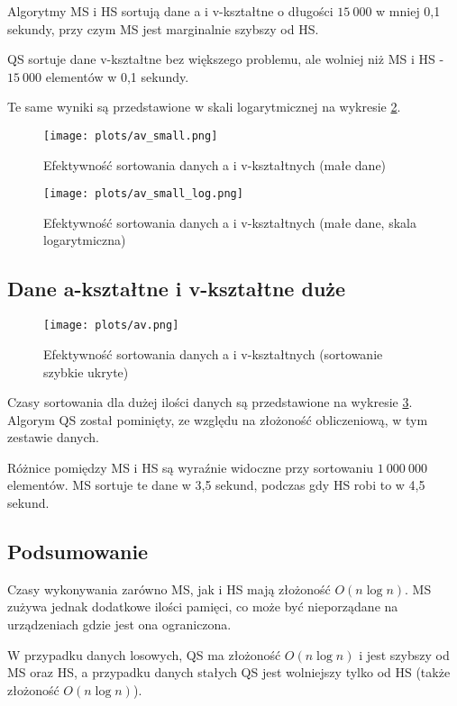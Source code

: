 \documentclass[11pt,twocolumn]{article}
\begin{document}
Algorytmy MS i HS sortują dane a i v-kształtne o długości $15\ 000$ w mniej 0,1 sekundy, przy czym MS jest marginalnie szybszy od HS.

QS sortuje dane v-kształtne bez większego problemu, ale wolniej niż MS i HS - $15\ 000$ elementów w 0,1 sekundy.

Te same wyniki są przedstawione w skali logarytmicznej na wykresie \ref{av_ksztaltne_male_log}.

\begin{figure}[h!]
	\texttt{[image: plots/av\_small.png]}
	\caption{Efektywność sortowania danych a i v-kształtnych (małe dane) \label{av_ksztaltne_male}}
\end{figure}

\begin{figure}[h!]
	\texttt{[image: plots/av\_small\_log.png]}
	\caption{Efektywność sortowania danych a i v-kształtnych (małe dane, skala logarytmiczna) \label{av_ksztaltne_male_log}}
\end{figure}



\subsection{Dane a-kształtne i v-kształtne duże}

\begin{figure}[h]
	\texttt{[image: plots/av.png]}
	\caption{Efektywność sortowania danych a i v-kształtnych (sortowanie szybkie ukryte) \label{av_ksztaltne_duze}}
\end{figure}

Czasy sortowania dla dużej ilości danych są przedstawione na wykresie \ref{av_ksztaltne_duze}. Algorym QS został pominięty, ze względu na złożoność obliczeniową, w tym zestawie danych.

Różnice pomiędzy MS i HS są wyraźnie widoczne przy sortowaniu $1\ 000\ 000$ elementów. MS sortuje te dane w 3,5 sekund, podczas gdy HS robi to w 4,5 sekund. 

\subsection{Podsumowanie}

Czasy wykonywania zarówno MS, jak i HS mają złożoność $O(n \log n)$. MS zużywa jednak dodatkowe ilości pamięci, co może być nieporządane na urządzeniach gdzie jest ona ograniczona.

W przypadku danych losowych, QS ma złożoność $O(n \log n)$ i jest szybszy od MS oraz HS, a przypadku danych stałych QS jest wolniejszy tylko od HS (także złożoność $O(n \log n)$). 
\end{document}
